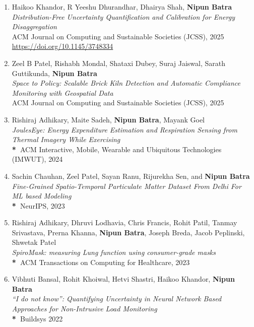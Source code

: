 \documentclass[letter,10pt]{article}
\begin{document}
\begin{itemize}
\begin{enumerate}
    \item{Haikoo Khandor, R Yeeshu Dhurandhar, Dhairya Shah, \textbf{Nipun Batra}}\\
    \textit{Distribution-Free Uncertainty Quantification and Calibration for Energy Disaggregation}\\
    {ACM Journal on Computing and Sustainable Societies (JCSS), 2025}\\
    \href{https://doi.org/10.1145/3748334}{https://doi.org/10.1145/3748334}

    \item{Zeel B Patel, Rishabh Mondal, Shataxi Dubey, Suraj Jaiswal, Sarath Guttikunda, \textbf{Nipun Batra}}\\
    \textit{Space to Policy: Scalable Brick Kiln Detection and Automatic Compliance Monitoring with Geospatial Data}\\
    {ACM Journal on Computing and Sustainable Societies (JCSS), 2025}

    \item{Rishiraj Adhikary, Maite Sadeh, \textbf{Nipun Batra}, Mayank Goel}\\
    \textit{JoulesEye: Energy Expenditure Estimation and Respiration Sensing from Thermal Imagery While Exercising}\\
      \textbf{*~}{ACM Interactive, Mobile, Wearable and Ubiquitous Technologies (IMWUT), 2024}

    \item{Sachin Chauhan, Zeel Patel, Sayan Ranu, Rijurekha Sen, and \textbf{Nipun Batra}}\\
    \textit{Fine-Grained Spatio-Temporal Particulate Matter Dataset From Delhi For ML based Modeling}\\
    \textbf{*~}{NeurIPS, 2023}

    \item{Rishiraj Adhikary, Dhruvi Lodhavia, Chris Francis, Rohit Patil, Tanmay Srivastava, Prerna Khanna, \textbf{Nipun Batra}, Joseph Breda, Jacob Peplinski, Shwetak Patel}\\
    \textit{SpiroMask: measuring Lung function using consumer-grade masks}\\
      \textbf{*~}{ACM Transactions on Computing for Healthcare, 2023}

\item{Vibhuti Bansal, Rohit Khoiwal,
  Hetvi Shastri,
  Haikoo Khandor,
  \textbf{Nipun Batra}}\\
    \textit{``I do not know'': Quantifying Uncertainty in Neural Network 
  Based Approaches for Non-Intrusive Load Monitoring}\\
      \textbf{*~}{Buildsys 2022}



\end{enumerate}
\end{itemize}
\end{document}
